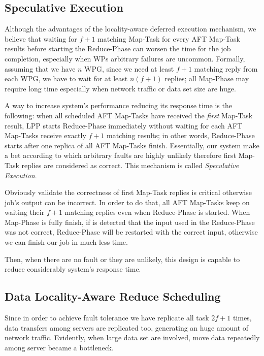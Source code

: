 \documentclass[sigchi]{acmart}
\begin{document}
\subsection{Speculative Execution}

Although the advantages of the locality-aware deferred execution mechanism, we believe that waiting for $f + 1$ matching Map-Task for every AFT Map-Task results before starting the Reduce-Phase can worsen the time for the job completion, especially when WPs arbitrary failures are uncommon. Formally, assuming that we have $n$ WPG, since we need at least $f + 1$ matching reply from each WPG, we have to wait for at least $n(f + 1)$ replies; all Map-Phase may require long time especially when network traffic or data set size are huge.

A way to increase system's performance reducing its response time is the following: when all scheduled AFT Map-Tasks have received the \textit{first} Map-Task result, LPP starts Reduce-Phase immediately without waiting for each AFT Map-Tasks receive exactly $f + 1$ matching results; in other words, Reduce-Phase starts after one replica of all AFT Map-Tasks finish. Essentially, our system make a bet according to which arbitrary faults are highly unlikely therefore first Map-Task replies are considered as correct. This mechanism is called \textit{Speculative Execution}.

Obviously validate the correctness of first Map-Task replies is critical otherwise job's output can be incorrect. In order to do that, all AFT Map-Tasks keep on waiting their $f + 1$ matching replies even when Reduce-Phase is started. When Map-Phase is fully finish, if is detected that the input used in the Reduce-Phase was not correct, Reduce-Phase will be restarted with the correct input, otherwise we can finish our job in much less time.

Then, when there are no fault or they are unlikely, this design is capable to reduce considerably system's response time. 

\subsection{Data Locality-Aware Reduce Scheduling}

Since in order to achieve fault tolerance we have replicate all task $2f + 1$ times, data transfers among servers are replicated too, generating an huge amount of network traffic. Evidently, when large data set are involved, move data repeatedly among server became a bottleneck.
\end{document}
